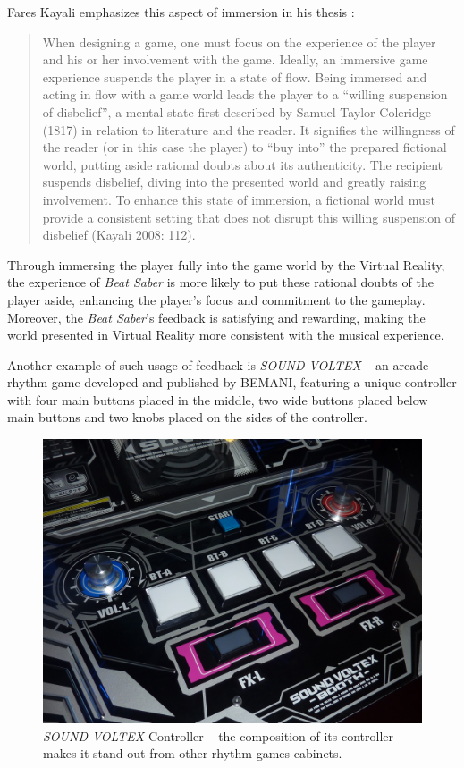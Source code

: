 Fares Kayali emphasizes this aspect of immersion in his thesis \cite{faresplayingmusic}:
\begin{quote}
    When designing a game, one must focus on the experience of the player and his or her involvement with the game. Ideally, an immersive game experience suspends the player in a state of flow. Being immersed and acting in flow with a game world leads the player to a ``willing suspension of disbelief'', a mental state first described by Samuel Taylor Coleridge (1817) in relation to literature and the reader. It signifies the willingness of the reader (or in this case the player) to ``buy into'' the prepared fictional world, putting aside rational doubts about its authenticity. The recipient suspends disbelief, diving into the presented world and greatly raising involvement. To enhance this state of immersion, a fictional world must provide a consistent setting that does not disrupt this willing suspension of disbelief (Kayali 2008: 112).
\end{quote}
Through immersing the player fully into the game world by the Virtual Reality, the experience of \textit{Beat Saber} is more likely to put these rational doubts of the player aside, enhancing the player’s focus and commitment to the gameplay. Moreover, the \textit{Beat Saber}’s feedback is satisfying and rewarding, making the world presented in Virtual Reality more consistent with the musical experience.

Another example of such usage of feedback is \textit{SOUND VOLTEX} -- an arcade rhythm game developed and published by BEMANI, featuring a unique controller with four main buttons placed in the middle, two wide buttons placed below main buttons and two knobs placed on the sides of the controller.

\begin{figure}[h]
    \centering\includegraphics[scale=0.75]{obrazki/sdvxcontroller.jpeg}
    \caption{\textit{SOUND VOLTEX} Controller -- the composition of its controller makes it stand out from other rhythm games cabinets.\cite{sdvxcontroller}}
    \label{fig:sdvx}
\end{figure}


